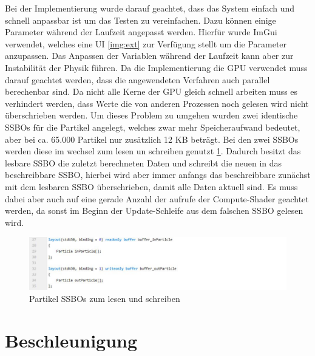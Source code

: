 \documentclass[intern,palatino]{cgBA}
\begin{document}
Bei der Implementierung wurde darauf geachtet, dass das System einfach und schnell anpassbar ist um das Testen zu vereinfachen.
Dazu können einige Parameter während der Laufzeit angepasst werden. Hierfür wurde ImGui \cite{ocornut} verwendet, welches eine UI \ref{img:ext} zur Verfügung stellt um die Parameter anzupassen.
Das Anpassen der Variablen während der Laufzeit kann aber zur Instabilität der Physik führen.
\newline
Da die Implementierung die GPU verwendet muss darauf geachtet werden, dass die angewendeten Verfahren auch parallel berechenbar sind. Da nicht alle Kerne der GPU gleich schnell arbeiten muss es verhindert werden, dass Werte die von anderen Prozessen noch gelesen wird nicht überschrieben werden.
Um dieses Problem zu umgehen wurden zwei identische SSBOs für die Partikel angelegt, welches zwar mehr Speicheraufwand bedeutet, aber bei ca. 65.000 Partikel nur zusätzlich 12 KB beträgt. Bei den zwei SSBOs werden diese im wechsel zum lesen un schreiben genutzt \ref{img:flipflop}. Dadurch besitzt das lesbare SSBO die zuletzt berechneten Daten und schreibt die neuen in das beschreibbare SSBO, hierbei wird aber immer anfangs das beschreibbare zunächst mit dem lesbaren SSBO überschrieben, damit alle Daten aktuell sind.
Es muss dabei aber auch auf eine gerade Anzahl der aufrufe der Compute-Shader geachtet werden, da sonst im Beginn der Update-Schleife aus dem falschen SSBO gelesen wird.
\newline

\begin{figure}[H]
	\centering
	\includegraphics[width=1.3\columnwidth]{Bilder/Flipflop.jpg}
	\caption{Partikel SSBOs zum lesen und schreiben}
	\label{img:flipflop}
\end{figure}
\newpage

\section{Beschleunigung}\label{besch}
\end{document}
